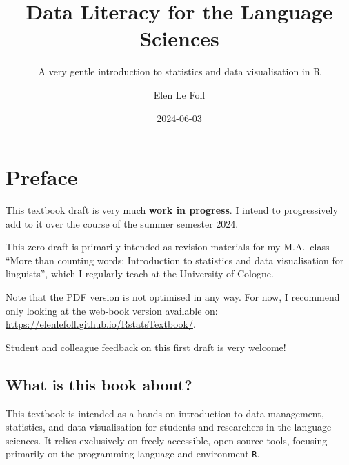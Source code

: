 \documentclass[
  letterpaper,
  DIV=11,
  numbers=noendperiod]{scrreprt}
\title{Data Literacy for the Language Sciences}
\subtitle{A very gentle introduction to statistics and data
visualisation in R}
\author{Elen Le Foll}
\date{2024-06-03}
\renewcommand*\contentsname{Table of contents}
\newcommand\contentsname{Table of contents}
\begin{document}
\maketitle

\renewcommand*\contentsname{Table of contents}
{
\hypersetup{linkcolor=}
\setcounter{tocdepth}{2}
\tableofcontents
}

\chapter*{Preface}\label{preface}


\begin{tcolorbox}[enhanced jigsaw, opacityback=0, bottomrule=.15mm, left=2mm, coltitle=black, bottomtitle=1mm, opacitybacktitle=0.6, leftrule=.75mm, arc=.35mm, breakable, toptitle=1mm, colframe=quarto-callout-warning-color-frame, colback=white, titlerule=0mm, colbacktitle=quarto-callout-warning-color!10!white, title=\textcolor{quarto-callout-warning-color}{\faExclamationTriangle}\hspace{0.5em}{Warning}, rightrule=.15mm, toprule=.15mm]

This textbook draft is very much \textbf{work in progress}. I intend to
progressively add to it over the course of the summer semester 2024.

This zero draft is primarily intended as revision materials for my
M.A.~class ``More than counting words: Introduction to statistics and
data visualisation for linguists'', which I regularly teach at the
University of Cologne.

Note that the PDF version is not optimised in any way. For now, I
recommend only looking at the web-book version available on:
\url{https://elenlefoll.github.io/RstatsTextbook/}.

Student and colleague feedback on this first draft is very welcome!

\end{tcolorbox}

\section*{What is this book about?}\label{what-is-this-book-about}


This textbook is intended as a hands-on introduction to data management,
statistics, and data visualisation for students and researchers in the
language sciences. It relies exclusively on freely accessible,
open-source tools, focusing primarily on the programming language and
environment \texttt{R}.
\end{document}
